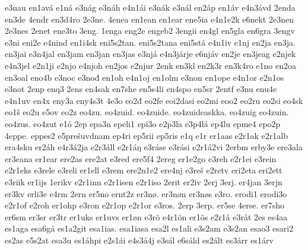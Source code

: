 {    e3nau
    en1avá
    e1ná
    e3nág
    e3náh
    e4n1ái
    e3nák
    e3nál
    en2áp
    en1áv
    e4n3ávd
    2enda
    en3de
    4endr
    en3d4ro
    2e3ne.
    4enea
    en1ean
    en1ear
    ene5ia
    e4n1e2k
    e6nekt
    2e3nen
    2e3nes
    2enet
    ene3to
    3eng.
    1enga
    eng2e
    engeb2
    3engii
    en4gl
    en5gla
    en6gra
    3engv
    e3ni
    eni2e
    e4nind
    en1i4sk
    eni5s2tan.
    eni5s2tana
    eni5stá
    e4n1iv
    e1nj
    en2ja
    en3ja.
    en3jai
    e3n4jal
    en3jam
    en3jan
    en3jas
    e3njá
    e4n3járje
    e6njáv
    en2je
    en3jeag
    e2njek
    e4n3jel
    e2n1ji
    e2njo
    e4njoh
    en2jos
    e2njur
    2enk
    en3kl
    en2k3r
    en3k4ro
    e1no
    en2oa
    en3oal
    eno4b
    e3noc
    e3nođ
    en1oh
    e4n1oj
    en1olm
    e3non
    en1ope
    e4n1or
    e2n1os
    e3not
    2enp
    enq3
    2ens
    en4sak
    en7she
    en5s4li
    en4spo
    en5sr
    2entf
    e3nu
    enu4e
    e4n1uv
    en4x
    eny3a
    eny4s3t
    4e3o
    eo2đ
    eo2fe
    eoi2dasi
    eo2mi
    eoo2
    eo2ru
    eo2si
    eo4sk
    eo1š
    eo2u
    e5ov
    eo2z
    eo4zu.
    eo4zuid.
    eo4zuide.
    eo4zuideaskka.
    eo4zuig
    eo4zuin.
    eo4zus.
    eo4zut
    e1ó
    2ep
    epa3n
    epeli1
    epi3o
    e2p3la
    e3p4lá
    ep4lu
    epme4
    epo2p
    4eppe.
    eppes2
    e5prešuvdnam
    ep4ri
    ep5rii
    ep5ris
    e1q
    e1r
    er1aas
    e2r1ak
    e2r1alb
    era4sku
    er2áh
    e4r3á2ja
    e2r3áll
    e2r1áŋ
    e3ráse
    e3rási
    e2r1á2vi
    2erbm
    erby3e
    ere3ala
    er3eana
    er1ear
    ere2as
    ere2at
    e3red
    ere5f4
    2ereg
    er1e2go
    e3reh
    e2r1ei
    e3rein
    e2r1eks
    e3rele
    e3reli
    er1ell
    e3rem
    ere2n1e2
    ere4nj
    e3reš
    e2retv
    eri2eta
    eri2ett
    e3riik
    er1ijs
    1erikv
    e2r1inn
    e2r1isen
    e2r1iso
    2erit
    er2iv
    2erj
    3erj.
    er4jan
    3erjn
    er3kv
    erli3e
    e4rm
    2ern
    er5no
    ernt2z
    er3nø.
    er3nøn
    er3nøs
    e3ro.
    erodi1
    erodi3o
    e2r1of
    e2roh
    er1ohp
    e3ron
    e2r1op
    e2r1or
    e3ros.
    2erp
    3erp.
    er5se
    4erse.
    er7sho
    er6sm
    er3sr
    er3tr
    er1uks
    er1uvs
    er1øn
    e3rö
    e4r1ön
    er1ös
    e2r1å
    e3råt
    2es
    es4aa
    es1aga
    esa6gá
    es1a2git
    esa1ias.
    esa1iasa
    esa2l
    es1ali
    e3s2am
    e3s2an
    esao3
    esari2
    es2as
    e5s2at
    esa3u
    es1áhpi
    e2s1ái
    e4s3á4j
    e3sál
    e6sáld
    es2ált
    es3árr
    es1árv
}
